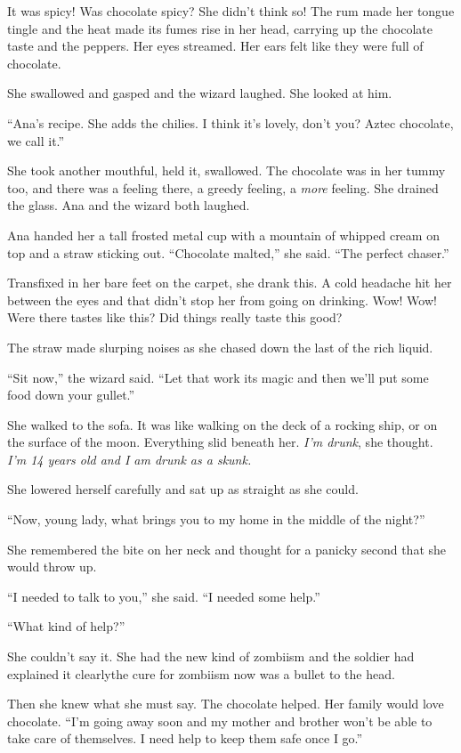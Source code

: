 It was spicy! Was chocolate spicy? She didn’t think so! The rum
made her tongue tingle and the heat made its fumes rise in her
head, carrying up the chocolate taste and the peppers. Her eyes
streamed. Her ears felt like they were full of chocolate.

She swallowed and gasped and the wizard laughed. She looked at
him.

“Ana’s recipe. She adds the chilies. I think it’s lovely, don’t
you? Aztec chocolate, we call it.”

She took another mouthful, held it, swallowed. The chocolate was in
her tummy too, and there was a feeling there, a greedy feeling, a
\emph{more} feeling. She drained the glass. Ana and the wizard both
laughed.

Ana handed her a tall frosted metal cup with a mountain of whipped
cream on top and a straw sticking out. “Chocolate malted,” she
said. “The perfect chaser.”

Transfixed in her bare feet on the carpet, she drank this. A cold
headache hit her between the eyes and that didn’t stop her from
going on drinking. Wow! Wow! Were there tastes like this? Did
things really taste this good?

The straw made slurping noises as she chased down the last of the
rich liquid.

“Sit now,” the wizard said. “Let that work its magic and then we’ll
put some food down your gullet.”

She walked to the sofa. It was like walking on the deck of a
rocking ship, or on the surface of the moon. Everything slid
beneath her. \emph{I’m drunk}, she thought.
\emph{I’m 14 years old and I am drunk as a skunk.}

She lowered herself carefully and sat up as straight as she could.

“Now, young lady, what brings you to my home in the middle of the
night?”

She remembered the bite on her neck and thought for a panicky
second that she would throw up.

“I needed to talk to you,” she said. “I needed some help.”

“What kind of help?”

She couldn’t say it. She had the new kind of zombiism and the
soldier had explained it clearly\dash{}the cure for zombiism now was a
bullet to the head.

Then she knew what she must say. The chocolate helped. Her family
would love chocolate. “I’m going away soon and my mother and
brother won’t be able to take care of themselves. I need help to
keep them safe once I go.”


